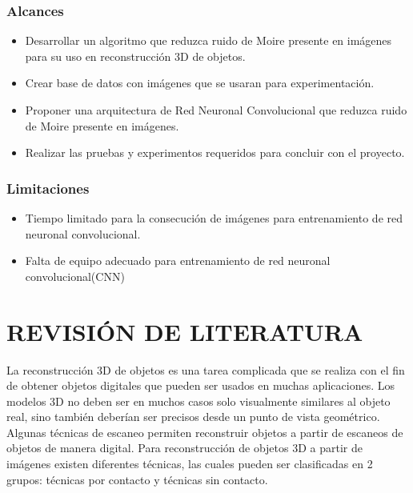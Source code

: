 \documentclass[10pt,letterpaper]{article}
\begin{document}
\subsubsection{Alcances}

\begin{itemize}
\item Desarrollar un algoritmo que reduzca ruido de Moire presente en imágenes para su uso en reconstrucción 3D de objetos.

\item Crear base de datos con imágenes que se usaran para experimentación.

\item Proponer una arquitectura de Red Neuronal Convolucional que reduzca ruido de Moire presente en imágenes.

\item Realizar las pruebas y experimentos requeridos para concluir con el proyecto.
\end{itemize}

\subsubsection{Limitaciones}
\begin{itemize}
\item Tiempo limitado para la consecución de imágenes para entrenamiento de red neuronal convolucional.

\item Falta de equipo adecuado para entrenamiento de red neuronal convolucional(CNN)
\end{itemize}



\section{REVISIÓN DE LITERATURA}
La reconstrucción 3D de objetos es una tarea complicada que se realiza con el fin de obtener objetos digitales que pueden ser usados en muchas aplicaciones. Los modelos 3D no deben ser en muchos casos solo visualmente similares al objeto real, sino también deberían ser precisos desde un punto de vista geométrico. Algunas técnicas de escaneo permiten reconstruir objetos a partir de escaneos de objetos de manera digital. Para reconstrucción de objetos 3D a partir de imágenes existen diferentes técnicas, las cuales pueden ser clasificadas en 2 grupos: técnicas por contacto y técnicas sin contacto\cite{Rocc:Cign}. %
\end{document}
